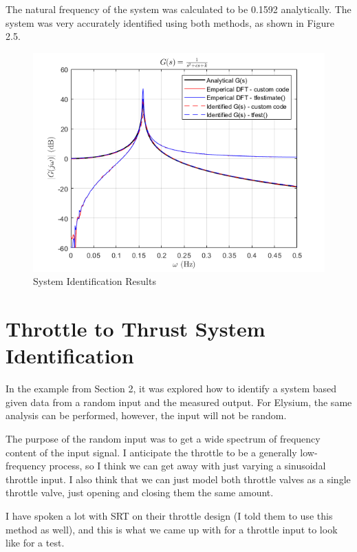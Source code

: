 \documentclass{article}
\begin{document}
The natural frequency of the system was calculated to be 0.1592 analytically. The system was very accurately identified using both methods, as shown in Figure 2.5.

\begin{figure}[h]
    \centering
    \includegraphics[width=1\linewidth]{figures/example_plots.png}
    \caption{System Identification Results}
    \label{fig:enter-label}
\end{figure}

\newpage

\section{Throttle to Thrust System Identification}

In the example from Section 2, it was explored how to identify a system based given data from a random input and the measured output. For Elysium, the same analysis can be performed, however, the input will not be random.

The purpose of the random input was to get a wide spectrum of frequency content of the input signal. I anticipate the throttle to be a generally low-frequency process, so I think we can get away with just varying a sinusoidal throttle input. I also think that we can just model both throttle valves as a single throttle valve, just opening and closing them the same amount.

I have spoken a lot with SRT on their throttle design (I told them to use this method as well), and this is what we came up with for a throttle input to look like for a test. 
\end{document}
